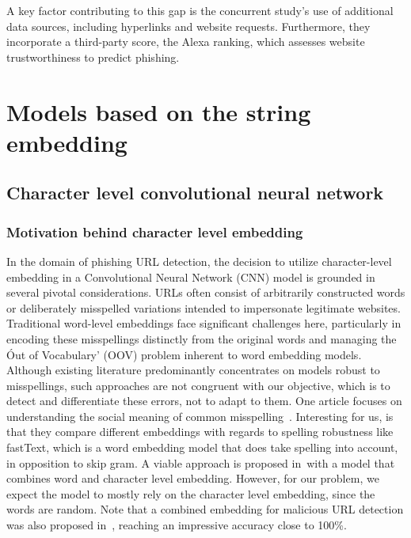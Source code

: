 \documentclass{article}
\begin{document}
    A key factor contributing to this gap is the concurrent study's use of additional data sources, including hyperlinks and website requests.
    Furthermore, they incorporate a third-party score, the Alexa ranking, which assesses website trustworthiness to predict phishing.


    \section{Models based on the string embedding}\label{sec:models-based-on-the-string-embedding}

    \subsection{Character level convolutional neural network}\label{subsec:character-level-convolutional-neural-network}

    \subsubsection{Motivation behind character level embedding}

    In the domain of phishing URL detection, the decision to utilize character-level embedding in a Convolutional Neural Network (CNN) model is grounded in several pivotal considerations.
    URLs often consist of arbitrarily constructed words or deliberately misspelled variations intended to impersonate legitimate websites.
    Traditional word-level embeddings face significant challenges here, particularly in encoding these misspellings distinctly from the original words and managing the \'Out of Vocabulary' (OOV) problem inherent to word embedding models.
    Although existing literature predominantly concentrates on models robust to misspellings, such approaches are not congruent with our objective, which is to detect and differentiate these errors, not to adapt to them.
    One article focuses on understanding the social meaning of common misspelling~\cite{OOVmispelling}.
    Interesting for us, is that they compare different embeddings with regards to spelling robustness like fastText, which is a word embedding model that does take spelling into account, in opposition to skip gram.
    A viable approach is proposed in~\cite{WordCharacterEmbeddings}with a model that combines word and character level embedding.
    However, for our problem, we expect the model to mostly rely on the character level embedding, since the words are random.
    Note that a combined embedding for malicious URL detection was also proposed in~\cite{urlnet}, reaching an impressive accuracy close to 100\%.
\end{document}
